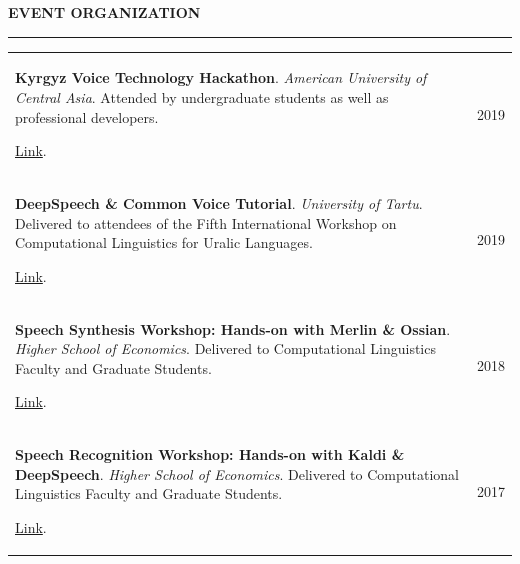 \documentclass{resume} %
\begin{document}




\begin{minipage}{\textwidth}
\sectionskip
\MakeUppercase{\textbf{Event Organization}}
  \sectionlineskip
  \hrule
\vspace{.5cm}

\renewcommand{\arraystretch}{1.5} %

\begin{tabular}{@{}p{}p{}@{}}
  {\bf Kyrgyz Voice Technology Hackathon}. {\em American University of Central Asia}. {Attended by undergraduate students as well as professional developers}. 
  
  \href{https://jrmeyer.github.io/kyrgyz-voice-hackathon/}{Link}.
  &
  \hfill {2019}
  \\
  {\bf DeepSpeech \& Common Voice Tutorial}. {\em University of Tartu}. {Delivered to attendees of the Fifth International Workshop on Computational Linguistics for Uralic Languages.}
  
  \href{https://sisu.ut.ee/iwclul2019/avaleht}{Link}.
  &
  \hfill {2019}
  \\
  {\bf Speech Synthesis Workshop: Hands-on with Merlin \& Ossian}. {\em Higher School of Economics}. {Delivered to Computational Linguistics Faculty and Graduate Students.}
  
  \href{http://jrmeyer.github.io/tts/2016/12/09/tts-workshop.html}{Link}.
  &
  \hfill {2018}
  \\
  {\bf Speech Recognition Workshop: Hands-on with Kaldi \& DeepSpeech}. {\em Higher School of Economics}.  {Delivered to Computational Linguistics Faculty and Graduate Students.}
  
  \href{http://jrmeyer.github.io/misc/stt-vishka.pdf}{Link}.
  &
  \hfill {2017}
  \\
\end{tabular}

\end{minipage}




\end{document}
